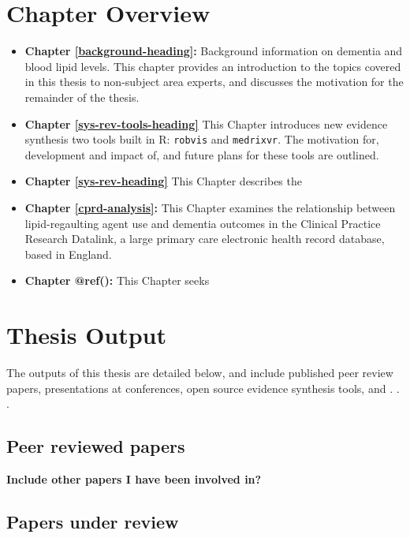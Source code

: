 \documentclass[a4paper, nobind]{templates/ociamthesis}
\providecommand{\tightlist}{%
  \setlength{\itemsep}{0pt}\setlength{\parskip}{0pt}}
\begin{document}
\hypertarget{chapter-overview}{%
\section{Chapter Overview}\label{chapter-overview}}

\begin{itemize}
\tightlist
\item
  \textbf{Chapter \ref{background-heading}:} Background information on dementia and blood lipid levels. This chapter provides an introduction to the topics covered in this thesis to non-subject area experts, and discusses the motivation for the remainder of the thesis.
\item
  \textbf{Chapter \ref{sys-rev-tools-heading}} This Chapter introduces new evidence synthesis two tools built in R: \texttt{robvis} and \texttt{medrixvr}. The motivation for, development and impact of, and future plans for these tools are outlined.
\item
  \textbf{Chapter \ref{sys-rev-heading}} This Chapter describes the
\item
  \textbf{Chapter \ref{cprd-analysis}:} This Chapter examines the relationship between lipid-regaulting agent use and dementia outcomes in the Clinical Practice Research Datalink, a large primary care electronic health record database, based in England.
\item
  \textbf{Chapter @ref():} This Chapter seeks
\end{itemize}

\hypertarget{thesis-output}{%
\section{Thesis Output}\label{thesis-output}}

The outputs of this thesis are detailed below, and include published peer review papers, presentations at conferences, open source evidence synthesis tools, and . . .

\hypertarget{peer-reviewed-papers}{%
\subsection{Peer reviewed papers}\label{peer-reviewed-papers}}

\textbf{Include other papers I have been involved in?}

\hypertarget{papers-under-review}{%
\subsection{Papers under review}\label{papers-under-review}}
\end{document}
